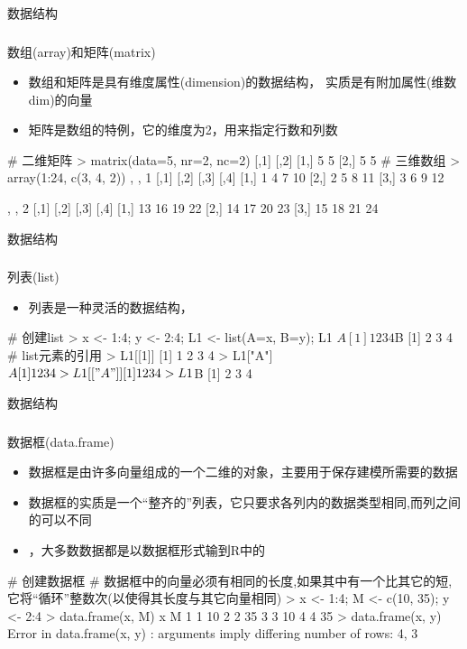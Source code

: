 \documentclass{beamerthemeMono}
\begin{document}
\begin{frame}[t,fragile]{\subsecname}{数据结构}
  \frametitle{}{数组(array)和矩阵(matrix)}
  \begin{itemize}
  \item 数组和矩阵是具有维度属性(dimension)的数据结构，
        实质是有附加属性(维数dim)的向量
  \item 矩阵是数组的特例，它的维度为2，用来指定行数和列数
  \end{itemize}  

\begin{rcode}
# 二维矩阵
> matrix(data=5, nr=2, nc=2)
     [,1] [,2]
[1,]    5    5
[2,]    5    5
# 三维数组
> array(1:24, c(3, 4, 2))
, , 1
     [,1] [,2] [,3] [,4]
[1,]    1    4    7   10
[2,]    2    5    8   11
[3,]    3    6    9   12

, , 2
     [,1] [,2] [,3] [,4]
[1,]   13   16   19   22
[2,]   14   17   20   23
[3,]   15   18   21   24
\end{rcode}  
\end{frame}

\begin{frame}[t,fragile]{\subsecname}{数据结构}
  \frametitle{}{列表(list)}
  \begin{itemize}
  \item 列表是一种灵活的数据结构，
  \end{itemize}  

\begin{rcode}
# 创建list
> x <- 1:4; y <- 2:4; L1 <- list(A=x, B=y); L1
$A
[1] 1 2 3 4

$B
[1] 2 3 4
# list元素的引用
> L1[[1]]
[1] 1 2 3 4
> L1["A"]
$A
[1] 1 2 3 4
> L1[["A"]]
[1] 1 2 3 4
> L1$B
[1] 2 3 4
\end{rcode}  
\end{frame}

\begin{frame}[t,fragile]{\subsecname}{数据结构}
  \frametitle{}{数据框(data.frame)}
  \begin{itemize}
  \item 数据框是由许多向量组成的一个二维的对象，主要用于保存建模所需要的数据
  \item 数据框的实质是一个“整齐的”列表，它只要求各列内的数据类型相同,而列之间的可以不同
  \item {}，大多数数据都是以数据框形式输到R中的
  \end{itemize}  

\begin{rcode}
# 创建数据框
# 数据框中的向量必须有相同的长度,如果其中有一个比其它的短,它将“循环”整数次(以使得其长度与其它向量相同)
> x <- 1:4; M <- c(10, 35); y <- 2:4
> data.frame(x, M)
  x  M
1 1 10
2 2 35
3 3 10
4 4 35
> data.frame(x, y)
Error in data.frame(x, y) :
   arguments imply differing number of rows: 4, 3
\end{rcode}  
\end{frame}
\end{document}
